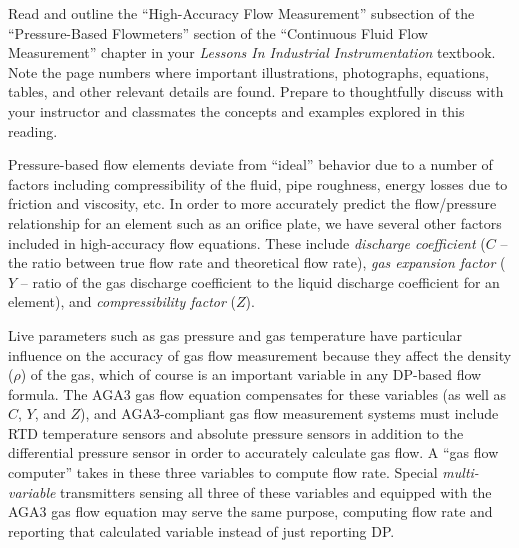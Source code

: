 

Read and outline the ``High-Accuracy Flow Measurement'' subsection of the ``Pressure-Based Flowmeters'' section of the ``Continuous Fluid Flow Measurement'' chapter in your {\it Lessons In Industrial Instrumentation} textbook.  Note the page numbers where important illustrations, photographs, equations, tables, and other relevant details are found.  Prepare to thoughtfully discuss with your instructor and classmates the concepts and examples explored in this reading.














Pressure-based flow elements deviate from ``ideal'' behavior due to a number of factors including compressibility of the fluid, pipe roughness, energy losses due to friction and viscosity, etc.  In order to more accurately predict the flow/pressure relationship for an element such as an orifice plate, we have several other factors included in high-accuracy flow equations.  These include {\it discharge coefficient} ($C$ -- the ratio between true flow rate and theoretical flow rate), {\it gas expansion factor} ($Y$ -- ratio of the gas discharge coefficient to the liquid discharge coefficient for an element), and {\it compressibility factor} ($Z$).

\vskip 10pt

Live parameters such as gas pressure and gas temperature have particular influence on the accuracy of gas flow measurement because they affect the density ($\rho$) of the gas, which of course is an important variable in any DP-based flow formula.  The AGA3 gas flow equation compensates for these variables (as well as $C$, $Y$, and $Z$), and AGA3-compliant gas flow measurement systems must include RTD temperature sensors and absolute pressure sensors in addition to the differential pressure sensor in order to accurately calculate gas flow.  A ``gas flow computer'' takes in these three variables to compute flow rate.  Special {\it multi-variable} transmitters sensing all three of these variables and equipped with the AGA3 gas flow equation may serve the same purpose, computing flow rate and reporting that calculated variable instead of just reporting DP.

